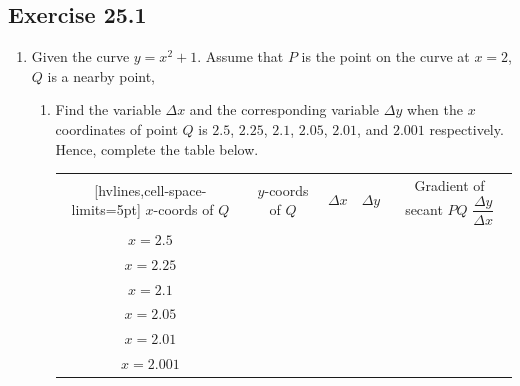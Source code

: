 \documentclass[12pt]{report}
\begin{document}
\newpage
\subsection{Exercise 25.1}

\begin{enumerate}
    \item Given the curve $y = x^2 + 1$. Assume that $P$ is the point on the curve at $x
              = 2$, $Q$ is a nearby point,
          \begin{enumerate}
              \item Find the variable $\Delta{x}$ and the corresponding variable $\Delta y$ when
                    the $x$ coordinates of point $Q$ is $2.5$, $2.25$, $2.1$, $2.05$, $2.01$, and
                    $2.001$ respectively. Hence, complete the table below.
                    \begin{center}
                        \begin{NiceTabular}{|c|c|c|c|c|}[hvlines,cell-space-limits=5pt]
                            $x$-coords of $Q$ & $y$-coords of $Q$ & $\Delta{x}$ & $\Delta y$ & Gradient of secant $PQ$ $\dfrac{\Delta y}{\Delta{x}}$ \\
                            $x = 2.5$         &                   &             &            &                                                       \\
                            $x = 2.25$        &                   &             &            &                                                       \\
                            $x = 2.1$         &                   &             &            &                                                       \\
                            $x = 2.05$        &                   &             &            &                                                       \\
                            $x = 2.01$        &                   &             &            &                                                       \\
                            $x = 2.001$       &                   &             &            &                                                       \\
                        \end{NiceTabular}
                    \end{center}
                    \sol{}


\end{enumerate}
\end{enumerate}
\end{document}
